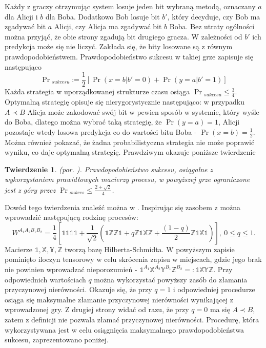 \documentclass[10pt]{article} %
\newtheorem{tw}{Twierdzenie}
\newcommand{\WAll}{W^{A_1A_2B_1B_2}}
\newcommand{\X}{\mathbb{X}}
\newcommand{\Y}{\mathbb{Y}}
\newcommand{\Z}{\mathbb{Z}}
\newcommand{\I}{\mathbb{1}}
\begin{document}
Każdy z graczy otrzymując system losuje jeden bit wybraną metodą, oznaczany $a$ dla Alicji i $b$ dla Boba. Dodatkowo Bob losuje bit $b'$, który decyduje, czy Bob ma zgadywać bit $a$ Alicji, czy Alicja ma zgadywać bit $b$ Boba. Bez utraty ogólności można przyjąć, że obie strony zgadują bit drugiego gracza. W zależności od $b'$ ich 
predykcja może się nie liczyć. Zakłada się, że bity losowane są z równym prawdopodobieństwem. Prawdopodobieństwo sukcesu w takiej grze zapisuje się następująco
\begin{equation}
\Pr{}_{sukcesu} := \frac{1}{2} \left[ \Pr(x=b|b'=0) + \Pr(y=a|b' = 1)\right]
\end{equation}
Każda strategia w uporządkowanej strukturze czasu osiąga $\Pr{}_{sukcesu} \leq \frac{3}{4}$. Optymalną strategię opisuje się nierygorystycznie następująco: w przypadku $A \prec B$ Alicja może zakodować swój bit w pewien sposób w systemie, który wyśle do Boba, dlatego można wybrać taką strategię, że $\Pr(y=a) = 1$, Alicji pozostaje wtedy losowa predykcja co do wartości bitu Boba - $\Pr(x=b) = \frac{1}{2}$. Można również pokazać, że żadna probabilistyczna strategia nie może poprawić wyniku, co daje optymalną strategię. Prawdziwym okazuje poniższe twierdzenie 
\begin{tw} \label{cin}
(por. \cite{max_violation}).
Prawdopodobieństwo sukcesu, osiągalne z wykorzystaniem prawidłowych macierzy procesu, w powyższej grze ograniczone jest z góry przez $\Pr{}_{sukces} \leq \frac{2+\sqrt{2}}{4}$.
\end{tw}
Dowód tego twierdzenia znaleźć można w \cite{max_violation}.
Inspirując się zasobem z \cite{process_matrix} można wprowadzić następującą rodzinę procesów:
\begin{equation}
\WAll = \frac{1}{4}\left[
\I\I\I\I + \frac{1}{\sqrt{2}}(\I\Z\Z\I + q\Z\I\X\Z + \frac{(1-q)}{2}\Z\I\X\I)
\right],~ 0 \leq q \leq 1.
\end{equation}
Macierze $\I, \X, \Y, \Z$ tworzą bazę Hilberta-Schmidta. W powyższym zapisie pominięto iloczyn tensorowy w celu skrócenia zapisu w miejscach, gdzie jego brak nie powinien wprowadzać nieporozumień - $\I^{A_1}\X^{A_2}\Y^{B_1}\Z^{B_2} =: \I\X\Y\Z$.
Przy odpowiednich wartościach $q$ można wykorzystać powyższy zasób do złamania przyczynowej nierówności. Okazuje się, że przy $q=1$ i odpowiedniej procedurze osiąga się maksymalne złamanie przyczynowej nierówności wynikającej z wprowadzonej gry. Z drugiej strony widać od razu, że przy $q=0$ ma się $A \prec B$, zatem z definicji nie pozwala złamać przyczynowej nierówności. Procedurę, która wykorzystywana jest w celu osiągnięcia maksymalnego prawdopodobieństwa sukcesu, zaprezentowano poniżej.
\end{document}
